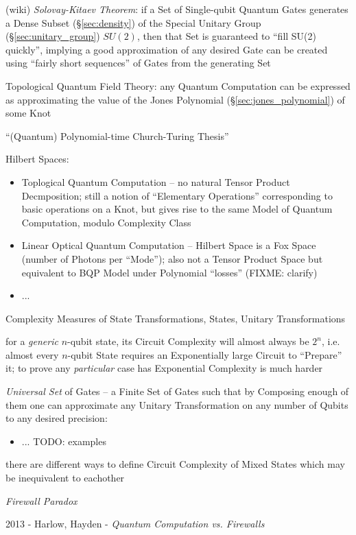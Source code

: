 (wiki) \emph{Solovay-Kitaev Theorem}: if a Set of Single-qubit Quantum Gates
generates a Dense Subset (\S\ref{sec:density}) of the Special Unitary Group
(\S\ref{sec:unitary_group}) $SU(2)$, then that Set is guaranteed to ``fill SU(2)
quickly'', implying a good approximation of any desired Gate can be created
using ``fairly short sequences'' of Gates from the generating Set

Topological Quantum Field Theory: any Quantum Computation can be expressed as
approximating the value of the Jones Polynomial (\S\ref{sec:jones_polynomial})
of some Knot

``(Quantum) Polynomial-time Church-Turing Thesis''

Hilbert Spaces:
\begin{itemize}
  \item Toplogical Quantum Computation -- no natural Tensor Product
    Decmposition; still a notion of ``Elementary Operations'' corresponding to
    basic operations on a Knot, but gives rise to the same Model of Quantum
    Computation, modulo Complexity Class
  \item Linear Optical Quantum Computation -- Hilbert Space is a Fox Space
    (number of Photons per ``Mode''); also not a Tensor Product Space but
    equivalent to BQP Model under Polynomial ``losses'' (FIXME: clarify)
  \item ...
\end{itemize}

Complexity Measures of State Transformations, States, Unitary Transformations

for a \emph{generic} $n$-qubit state, its Circuit Complexity will almost always
be $2^n$, i.e. almost every $n$-qubit State requires an Exponentially large
Circuit to ``Prepare'' it; to prove any \emph{particular} case has Exponential
Complexity is much harder

\emph{Universal Set} of Gates -- a Finite Set of Gates such that by Composing
enough of them one can approximate any Unitary Transformation on any number of
Qubits to any desired precision:
\begin{itemize}
  \item ... TODO: examples
\end{itemize}

there are different ways to define Circuit Complexity of Mixed States which may
be inequivalent to eachother

\emph{Firewall Paradox}

2013 - Harlow, Hayden - \emph{Quantum Computation vs. Firewalls}


